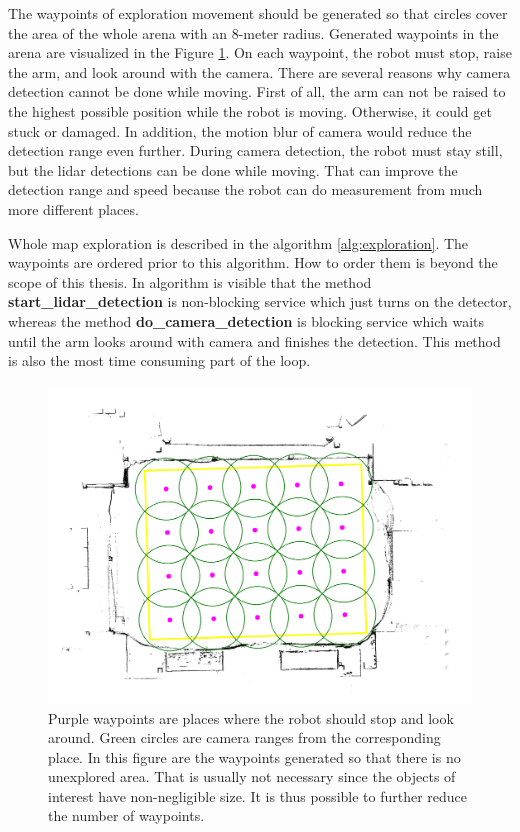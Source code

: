The waypoints of exploration movement should be generated so that circles cover the area of the whole arena with an 8-meter radius. Generated waypoints in the arena are visualized in the Figure \ref{fig:map_annot}. On each waypoint, the robot must stop, raise the arm, and look around with the camera. There are several reasons why camera detection cannot be done while moving. First of all, the arm can not be raised to the highest possible position while the robot is moving. Otherwise, it could get stuck or damaged. In addition, the motion blur of camera would reduce the detection range even further. During camera detection, the robot must stay still, but the lidar detections can be done while moving. That can improve the detection range and speed because the robot can do measurement from much more different places. 

Whole map exploration is described in the algorithm \ref{alg:exploration}. The waypoints are ordered prior to this algorithm. How to order them is beyond the scope of this thesis. In algorithm is visible that the method \textbf{start\_lidar\_detection} is non-blocking service which just turns on the detector, whereas the method \textbf{do\_camera\_detection} is blocking service which waits until the arm looks around with camera and finishes the detection. This method is also the most time consuming part of the loop.

\begin{figure}[H]
	\centering
	\includegraphics[scale=0.23]{fig/map_annotation.png}
	\caption[Generated waypoints]{Purple waypoints are places where the robot should stop and look around. Green circles are camera ranges from the corresponding place. In this figure are the waypoints generated so that there is no unexplored area. That is usually not necessary since the objects of interest have non-negligible size. It is thus possible to further reduce the number of waypoints.}
	\label{fig:map_annot}
\end{figure}

